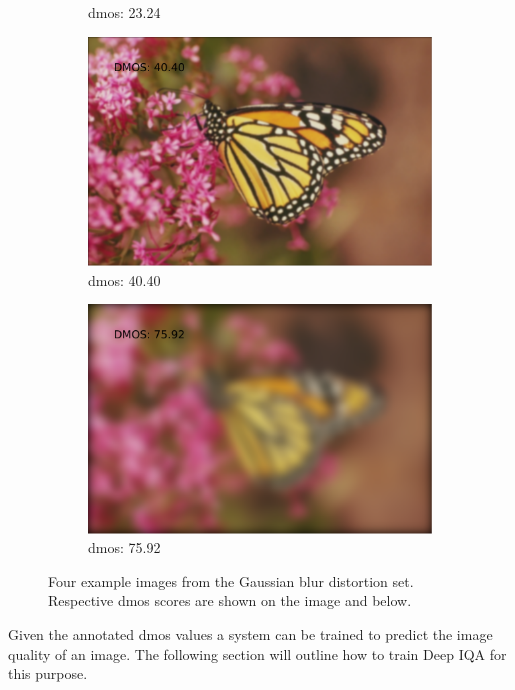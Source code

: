 \begin{figure}[H]
\begin{subfigure}[b]{0.4\textwidth}
        \caption{\gls{dmos}: 23.24}\label{fig:}
    \end{subfigure}
    \begin{subfigure}[b]{0.4\textwidth}
        \center
        \includegraphics[width=\textwidth]{Figs/Implementation/img103.pdf}
        \caption{\gls{dmos}: 40.40}\label{fig:}
    \end{subfigure}
    \begin{subfigure}[b]{0.4\textwidth}
	    \center
	    \includegraphics[width=\textwidth]{Figs/Implementation/img11.pdf}
	    \caption{\gls{dmos}: 75.92}\label{fig:}
    \end{subfigure}
    \caption{Four example images from the Gaussian blur distortion set. Respective \gls{dmos} scores are shown on the image and below.}
    \label{fig:gb_ex}
\end{figure} 

Given the annotated \gls{dmos} values a system can be trained to predict the image quality of an image. The following section will outline how to train Deep IQA for this purpose.

